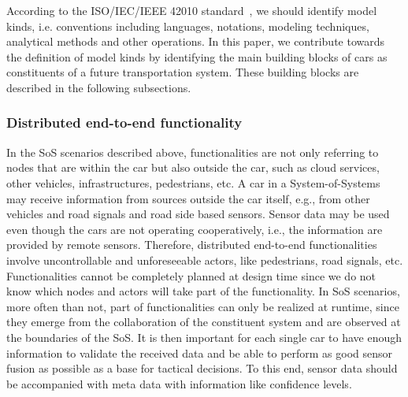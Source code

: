According to the ISO/IEC/IEEE 42010 standard~\cite{42010}, we should identify model kinds, i.e. conventions
including languages, notations, modeling techniques, analytical methods and other
operations. In this paper, we contribute towards the definition of model kinds by identifying the 
main building blocks of cars as constituents of a future transportation system. These building blocks are described in the following subsections.

\subsubsection{Distributed end-to-end functionality} 
%

In the SoS scenarios described above, functionalities are not only referring to nodes that are within the car but also outside the car, such as cloud services, other vehicles, infrastructures, pedestrians, etc. A car in a System-of-Systems may receive information from sources outside the car itself, e.g., from other vehicles and road signals and road side based sensors. Sensor data may be used even though the cars are not operating cooperatively, i.e., the information are provided by remote sensors. Therefore, distributed end-to-end functionalities involve uncontrollable and unforeseeable actors, like pedestrians, road signals, etc. Functionalities cannot be completely planned at design time since we do not know which nodes and actors will take part of the functionality. In SoS scenarios, more often than not, part of functionalities can only be realized at runtime, since they emerge from the collaboration of the constituent system and are observed at the boundaries of the SoS. It is then important for each single car to have enough information to validate the received data and be able to perform as good sensor fusion as possible as a base for tactical decisions. To this end, sensor data should be accompanied with meta data with information like confidence levels.

%

